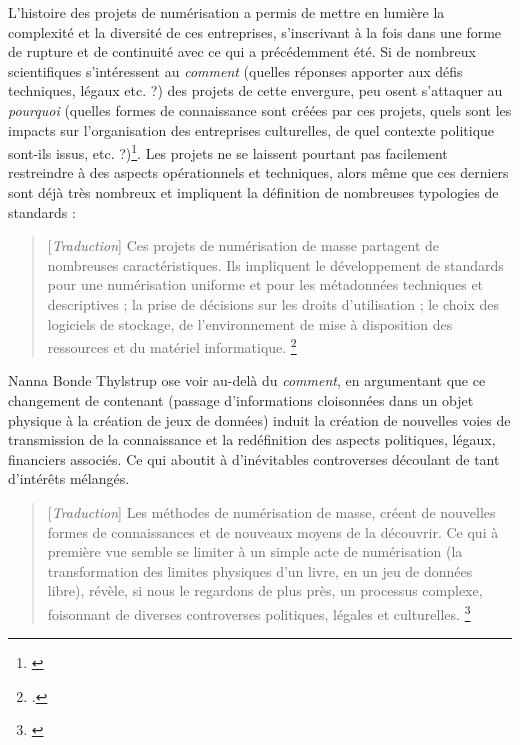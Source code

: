 L'histoire des projets de numérisation a permis de mettre en lumière la complexité et la diversité de ces entreprises, s'inscrivant à la fois dans une forme de rupture et de continuité avec ce qui a précédemment été. Si de nombreux scientifiques s'intéressent au \textit{comment} (quelles réponses apporter aux défis techniques, légaux etc. ?) des projets de cette envergure, peu osent s'attaquer au \textit{pourquoi} (quelles formes de connaissance sont créées par ces projets, quels sont les impacts sur l'organisation des entreprises culturelles, de quel contexte politique sont-ils issus, etc. ?)\footnote{\cite{thylstrup_politics_2018}}. Les projets ne se laissent pourtant pas facilement restreindre à des aspects opérationnels et techniques, alors même que ces derniers sont déjà très nombreux et impliquent la définition de nombreuses typologies de standards : 

\begin{quotation}
[\textit{Traduction}]
Ces projets de numérisation de masse partagent de nombreuses caractéristiques. Ils impliquent le développement de standards pour une numérisation uniforme et pour les métadonnées techniques et descriptives ; la prise de décisions sur les droits d'utilisation ; le choix des logiciels de stockage, de l'environnement de mise à disposition des ressources et du matériel informatique.
\footnote{\cite[p.11]{kowalczyk_digital_2018}.}
\end{quotation}

Nanna Bonde Thylstrup ose voir au-delà du \textit{comment}, en argumentant que ce changement de contenant (passage d'informations cloisonnées dans un objet physique à la création de jeux de données) induit la création de nouvelles voies de transmission de la connaissance et la redéfinition des aspects politiques, légaux, financiers associés. Ce qui aboutit à d'inévitables controverses découlant de tant d'intérêts mélangés.

\begin{quotation}
[\textit{Traduction}]
Les méthodes de numérisation de masse, créent de nouvelles formes de connaissances et de nouveaux moyens de la découvrir. Ce qui à première vue semble se limiter à un simple acte de numérisation (la transformation des limites physiques d'un livre, en un jeu de données libre), révèle, si nous le regardons de plus près, un processus complexe, foisonnant de diverses controverses politiques, légales et culturelles.
\footnote{\cite[p.1]{thylstrup_politics_2018}}
\end{quotation}

